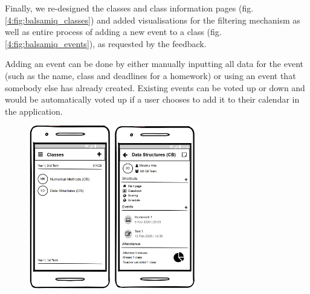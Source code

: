 Finally, we re-designed the classes and class information pages (fig. \ref{4:fig:balsamiq_classes}) and added visualisations for the filtering mechanism as well as entire process of adding a new event to a class (fig. \ref{4:fig:balsamiq_events}), as requested by the feedback.

Adding an event can be done by either manually inputting all data for the event (such as the name, class and deadlines for a homework) or using an event that somebody else has already created. Existing events can be voted up or down and would be automatically voted up if a user chooses to add it to their calendar in the application.

\clearpage

\begin{figure}[!ht]
    \centering
     \includegraphics[width=0.32\textwidth]{figures/app/balsamiq/classes.png}
     \hfill
     \includegraphics[width=0.32\textwidth]{figures/app/balsamiq/class_info.png}

\end{figure}
